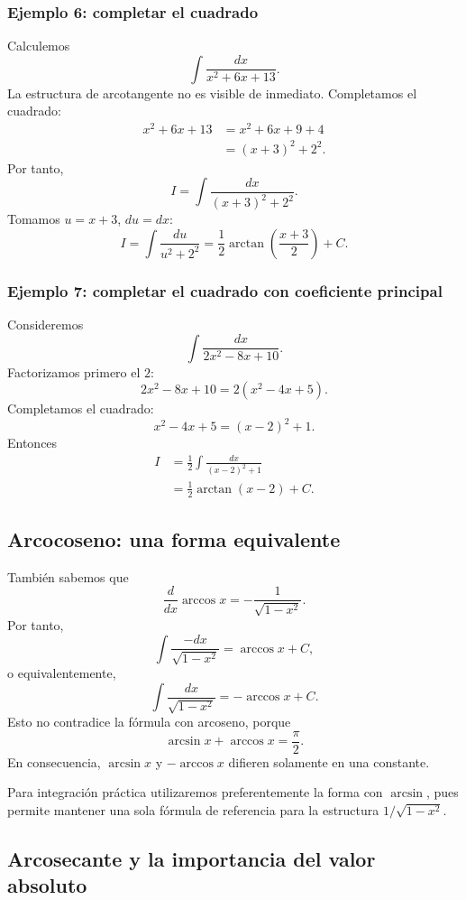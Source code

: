 \subsubsection*{Ejemplo 6: completar el cuadrado}
Calculemos
\[
\int\frac{dx}{x^2+6x+13}.
\]
La estructura de arcotangente no es visible de inmediato. Completamos el
cuadrado:
\begin{align*}
x^2+6x+13
&=x^2+6x+9+4\\
&=(x+3)^2+2^2.
\end{align*}
Por tanto,
\[
I=\int\frac{dx}{(x+3)^2+2^2}.
\]
Tomamos $u=x+3$, $du=dx$:
\[
I=\int\frac{du}{u^2+2^2}
=\boxed{\frac12\arctan\left(\frac{x+3}{2}\right)+C}.
\]

\subsubsection*{Ejemplo 7: completar el cuadrado con coeficiente principal}
Consideremos
\[
\int\frac{dx}{2x^2-8x+10}.
\]
Factorizamos primero el $2$:
\[
2x^2-8x+10=2(x^2-4x+5).
\]
Completamos el cuadrado:
\[
x^2-4x+5=(x-2)^2+1.
\]
Entonces
\begin{align*}
I
&=\frac12\int\frac{dx}{(x-2)^2+1}\\
&=\boxed{\frac12\arctan(x-2)+C}.
\end{align*}

\subsection{Arcocoseno: una forma equivalente}

También sabemos que
\[
\frac{d}{dx}\arccos x=-\frac1{\sqrt{1-x^2}}.
\]
Por tanto,
\[
\int\frac{-dx}{\sqrt{1-x^2}}=\arccos x+C,
\]
o equivalentemente,
\[
\int\frac{dx}{\sqrt{1-x^2}}=-\arccos x+C.
\]
Esto no contradice la fórmula con arcoseno, porque
\[
\arcsin x+\arccos x=\frac\pi2.
\]
En consecuencia, $\arcsin x$ y $-\arccos x$ difieren solamente en una
constante.

\begin{observacion}
Para integración práctica utilizaremos preferentemente la forma con
$\arcsin$, pues permite mantener una sola fórmula de referencia para la
estructura $1/\sqrt{1-x^2}$.
\end{observacion}

\subsection{Arcosecante y la importancia del valor absoluto}

